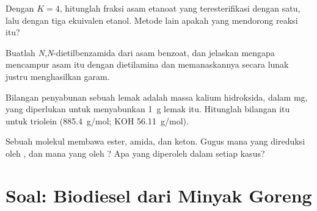 \begin{exercise}[$\star\star$]\label{exo:b2:acyl-substitution:9}
Dengan $K = 4$, hitunglah fraksi asam etanoat yang teresterifikasi dengan
satu, lalu dengan tiga ekuivalen etanol. Metode lain apakah yang mendorong
reaksi itu?
\end{exercise}

\begin{exercise}[$\star\star\star$]\label{exo:b2:acyl-substitution:10}
Buatlah \textit{N},\textit{N}-dietilbenzamida dari asam benzoat, dan
jelaskan mengapa mencampur asam itu dengan dietilamina dan memanaskannya
secara lunak justru menghasilkan garam.
\end{exercise}

\begin{exercise}[$\star\star\star$]\label{exo:b2:acyl-substitution:11}
Bilangan penyabunan sebuah lemak adalah massa kalium hidroksida, dalam mg,
yang diperlukan untuk menyabunkan \qty{1}{g} lemak itu. Hitunglah bilangan
itu untuk triolein (\qty{885.4}{g/mol}; KOH \qty{56.11}{g/mol}).
\end{exercise}

\begin{exercise}[$\star\star\star$]\label{exo:b2:acyl-substitution:12}
Sebuah molekul membawa ester, amida, dan keton. Gugus mana yang direduksi
oleh , dan mana yang oleh ? Apa yang diperoleh dalam
setiap kasus?
\end{exercise}

\section{Soal: Biodiesel dari Minyak Goreng}


